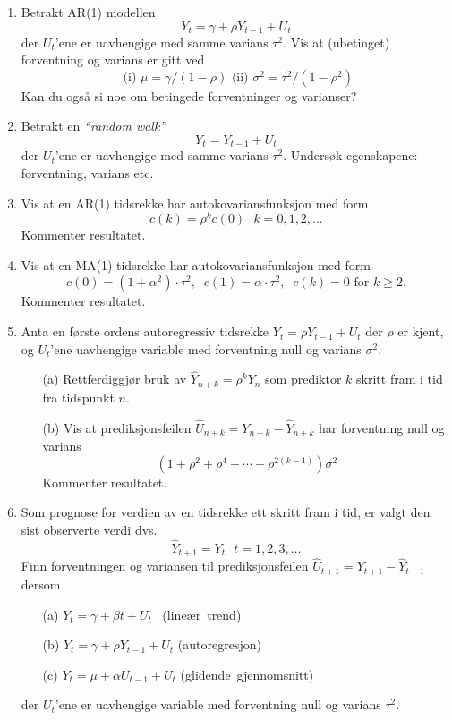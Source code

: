 \begin{enumerate}
\item Betrakt AR(1) modellen 
       \[ Y_t= \gamma +\rho Y_{t-1} + U_t \]
      der $U_t$'ene er uavhengige med samme varians ${\tau}^2$.
      Vis at (ubetinget) forventning og varians er gitt ved
      \[ \mbox{\ \ (i)\ \ } \mu = \gamma /(1-\rho ) \mbox{\ \ \ \ (ii)\ \ }
                                    {\sigma}^2 = {\tau}^2/(1-{\rho}^2) \]
      Kan du også si noe om betingede forventninger og varianser?
\item Betrakt en {\em ``random walk''}
       \[ Y_t=Y_{t-1}+U_t \]
      der $U_t$'ene er uavhengige med samme varians ${\tau}^2$.
      Undersøk egenskapene: forventning, varians etc.

\item Vis at en AR(1) tidsrekke har autokovariansfunksjon med form
\[   c(k)={\rho}^kc(0) \mbox{\ \ \ } k=0,1,2,\ldots         \]
Kommenter resultatet.

\item Vis at en MA(1) tidsrekke har autokovariansfunksjon med form
\[ c(0)=(1+{\alpha}^2)\cdot {\tau}^2,  \; \;c(1)={\alpha} \cdot {\tau}^2, \; \;
                         c(k)=0 \mbox{\ \ \ for \ \ } k \ge 2. \]
Kommenter resultatet.
\item Anta  en første ordens autoregressiv tidsrekke
  $Y_t = \rho Y_{t-1} + U_t$ der $\rho$ er kjent, og $U_t$'ene uavhengige
 variable med forventning null og varians ${\sigma}^2$.

\begin{itemize}
\item[(a)] Rettferdiggjør bruk av ${\hat{Y}}_{n+k} = {\rho}^kY_n$ som
 prediktor $k$ skritt fram i tid fra tidspunkt $n$.
\item[(b)] Vis at prediksjonsfeilen
 ${\hat{U}}_{n+k} = Y_{n+k} - {\hat{Y}}_{n+k}$
har forventning null og varians
\[ (1+{\rho}^2+{\rho}^4+ \cdots +{\rho}^{2(k-1)}){\sigma}^2 \]
Kommenter resultatet.
\end{itemize}

\item Som prognose for verdien av en tidsrekke ett skritt fram i tid,
  er valgt den sist observerte verdi dvs.
\[ {\hat{Y}}_{t+1}=Y_t \mbox{\ \ \ } t=1,2,3,\ldots    \]
Finn forventningen og variansen til prediksjonsfeilen ${\hat{U}}_{t+1} =
Y_{t+1} - {\hat{Y}}_{t+1}$ dersom
\begin{itemize}
\item[(a)] $Y_t = {\gamma} + {\beta}t + U_t$    \mbox{ (lineær trend)}
\item[(b)] $Y_t = \gamma + \rho Y_{t-1}+U_t$    \mbox{(autoregresjon)}
\item[(c)] $Y_t = \mu +\alpha U_{t-1}+U_t$       \mbox{(glidende gjennomsnitt)}
\end{itemize}
\noindent der $U_t$'ene er uavhengige variable med forventning null og
 varians ${\tau}^2$.


\end{enumerate}
